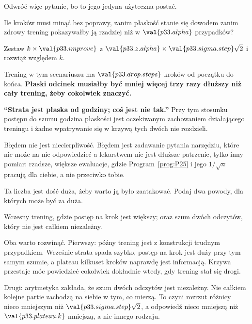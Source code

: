 \begin{fr}
Odwróć więc pytanie, bo to jego jedyna użyteczna postać.

Ile kroków musi minąć bez poprawy, zanim płaskość stanie się dowodem \dash{}
zanim zdrowy trening pokazywałby ją rzadziej niż w $\val{p33.alpha}$
przypadków?
\dotline
\nextframe
\end{fr}

\begin{fr}
\begin{ansblock}
Zestaw $k \times \val{p33.improve}$ z
$\val{p33.z.alpha} \times \val{p33.sigma.step}\sqrt{2}$ i rozwiąż względem
$k$.
\end{ansblock}

Trening w tym scenariuszu ma $\val{p33.drop.steps}$ kroków od początku do
końca. \textbf{Płaski odcinek musiałby być mniej więcej trzy razy dłuższy niż
cały trening, żeby cokolwiek znaczyć.}
\end{fr}


\begin{fr}
\begin{trapbox}
\textbf{\enquote{Strata jest płaska od godziny; coś jest nie tak.}} Przy tym
stosunku postępu do szumu godzina płaskości jest oczekiwanym zachowaniem
działającego treningu i żadne wpatrywanie się w krzywą tych dwóch nie
rozdzieli.

Błędem nie jest niecierpliwość. Błędem jest zadawanie pytania narzędziu, które
nie może na nie odpowiedzieć \dash{} a lekarstwem nie jest dłuższe patrzenie,
tylko inny pomiar: rzadsze, większe ewaluacje, gdzie Program~\ref{prog:P25}
i jego $1/\sqrt{n}$ pracują dla ciebie, a nie przeciwko tobie.
\end{trapbox}

Ta liczba jest dość duża, żeby warto ją było zaatakować. Podaj dwa powody, dla
których może być za duża.
\dotline
\nextframe
\end{fr}

\begin{fr}
\begin{ansblock}
Wczesny trening, gdzie postęp na krok jest większy; oraz szum dwóch odczytów,
który nie jest całkiem niezależny.
\end{ansblock}

Oba warto rozwinąć. Pierwszy: późny trening jest z konstrukcji trudnym
przypadkiem. Wcześnie strata spada szybko, postęp na krok jest duży przy tym
samym szumie, a plateau kilkuset kroków naprawdę jest informacją. Krzywa
przestaje móc powiedzieć cokolwiek dokładnie wtedy, gdy trening stał się
drogi.

Drugi: arytmetyka zakłada, że szum dwóch odczytów jest niezależny. Nie całkiem
\dash{} kolejne partie zachodzą na siebie w tym, co mierzą. To czyni rozrzut
różnicy nieco mniejszym niż $\val{p33.sigma.step}\sqrt{2}$, a odpowiedź nieco
mniejszą niż $\val{p33.plateau.k}$ \dash{} mniejszą, a nie innego rodzaju.
\end{fr}

